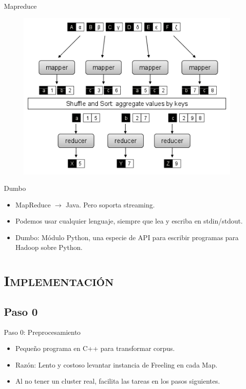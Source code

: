 \documentclass[xcolor=x11names,compress]{beamer}
\renewcommand{\(}{\begin{columns}}
\renewcommand{\)}{\end{columns}}
\newcommand{\<}[1]{\begin{column}{#1}}
\renewcommand{\>}{\end{column}}
\begin{document}
\begin{frame}{Mapreduce}
\begin{figure}
\centering
\includegraphics[scale=0.5, keepaspectratio=True, natwidth=800,natheight=600]{mapreduce.png}
\end{figure}
\end{frame}


\begin{frame}{Dumbo}
\begin{itemize}
\item MapReduce $\rightarrow$ Java. Pero soporta streaming.
\item Podemos usar cualquier lenguaje, siempre que lea y escriba en stdin/stdout.
\item Dumbo: Módulo Python, una especie de API para escribir programas para Hadoop sobre Python.
\end{itemize}
\end{frame}


\section{\scshape Implementación}
\subsection{Paso 0}
\begin{frame}{Paso 0: Preprocesamiento}
\begin{itemize}
\item Pequeño programa en C++ para transformar corpus.
\item Razón: Lento y costoso levantar instancia de Freeling en cada Map.
\item Al no tener un cluster real, facilita las tareas en los pasos siguientes.
\end{itemize}
\end{frame}
\end{document}
